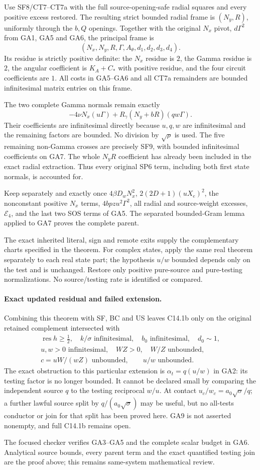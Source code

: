 Use SF8/CT7--CT7a with the full source-opening-safe radial squares
and every positive excess restored. The resulting strict bounded
radial frame is $(N_y,R)$, uniformly through the $b,Q$ openings.
Together with the original $N_x$ pivot, $d\Gamma^2$ from GA1,
GA5 and GA6, the principal frame is
\[
       (N_x,N_y,R,\Gamma,A_\theta,d_1,d_2,d_3,d_4).
       \tag{GA7}
\]
Its residue is strictly positive definite: the $N_x$ residue is
$2$, the Gamma residue is $2$, the angular coefficient is
$K_A+C_*$ with positive residue, and the four circuit coefficients
are $1$. All costs in GA5--GA6 and all CT7a remainders are bounded
infinitesimal matrix entries on this frame.

The two complete Gamma normals remain exactly
\[
      -4\nu N_x(u\Gamma)
       +R_\gamma(N_y+bR)(qw\Gamma).
       \tag{GA8}
\]
Their coefficients are infinitesimal directly because $u,q,w$ are
infinitesimal and the remaining factors are bounded. No division
by $\sqrt\rho$ is used. The five remaining non-Gamma crosses are
precisely SF9, with bounded infinitesimal coefficients on GA7.
The whole $N_yR$ coefficient has already been included in the
exact radial extraction. Thus every original SP6 term, including
both first state normals, is accounted for.

Keep separately and exactly once $4\beta D_wN_x^2$,
$2(2D+1)(uX_e)^2$, the nonconstant positive $N_x$ terms,
$4bpzu^2\Gamma^2$, all radial and source-weight excesses,
$\mathcal E_4$, and the last two SOS terms of GA5. The separated
bounded-Gram lemma applied to GA7 proves the complete parent.

The exact inherited literal, sign and remote exits supply the
complementary charts specified in the theorem. For complex states,
apply the same real theorem separately to each real state part;
the hypothesis $u/w$ bounded depends only on the test and is
unchanged. Restore only positive pure-source and pure-testing
normalizations. No source/testing rate is identified or compared.

\paragraph{Exact updated residual and failed extension.}
Combining this theorem with SF, BC and US leaves C14.1b only on
the original retained complement intersected with
\[
\begin{gathered}
 \operatorname{res}h\ge\tfrac12,\quad k/\sigma\text{ infinitesimal},
 \quad b_0\text{ infinitesimal},\quad d_0\sim1,\\
 u,w>0\text{ infinitesimal},\quad WZ>0,\quad W/Z\text{ unbounded},\\
 c=uW/(wZ)\text{ unbounded},\qquad u/w\text{ unbounded}.
\end{gathered}\tag{GA9}
\]
The exact obstruction to this particular extension is
$\alpha_t=q(u/w)$ in GA2: its testing factor is no longer bounded.
It cannot be declared small by comparing the independent source
$q$ to the testing reciprocal $w/u$. At contact
$u_c/w_c=a_0\sqrt\sigma/q$; a further lawful source split by
$q/(a_0\sqrt\sigma)$ may be useful, but no all-tests conductor or
join for that split has been proved here. GA9 is not asserted
nonempty, and full C14.1b remains open.

The focused checker verifies GA3--GA5 and the complete scalar
budget in GA6. Analytical source bounds, every parent term and the
exact quantified testing join are the proof above; this remains
same-system mathematical review.
